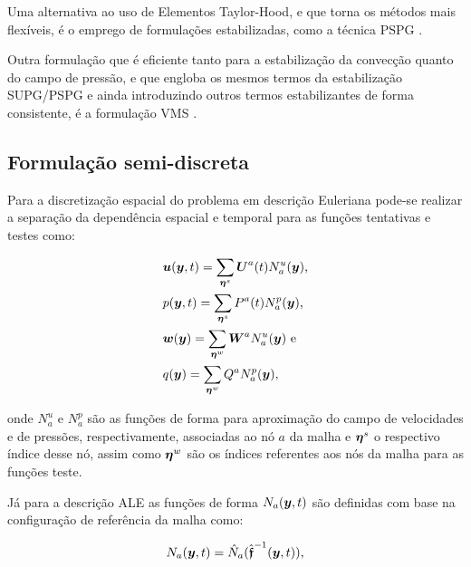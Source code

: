 Uma alternativa ao uso de Elementos Taylor-Hood, e que torna os métodos mais flexíveis, é o emprego de formulações estabilizadas, como a técnica PSPG \cite{tezduyar1991stabilized}.

Outra formulação que é eficiente tanto para a estabilização da convecção quanto do campo de pressão, e que engloba os mesmos termos da estabilização SUPG/PSPG e ainda introduzindo outros termos estabilizantes de forma consistente, é a formulação VMS \cite{bazilevs2013computational}.

\subsection{Formulação semi-discreta}

Para a discretização espacial do problema em descrição Euleriana pode-se realizar a separação da dependência espacial e temporal para as funções tentativas e testes como:

\begin{subequations}
    \begin{align}
         & \boldsymbol{u}(\boldsymbol{y},t)=\sum_{\boldsymbol{\eta}^s}{\boldsymbol{U}^a(t)N_a^u(\boldsymbol{y})}\text{,}\label{eq:uh} \\
         & p(\boldsymbol{y},t)=\sum_{\boldsymbol{\eta}^s}{P^a(t)N_a^p(\boldsymbol{y})}\text{,}                        \\
         & \boldsymbol{w}(\boldsymbol{y})=\sum_{\boldsymbol{\eta}^w}{\boldsymbol{W}^aN_a^u(\boldsymbol{y})}\text{ e}\label{eq:w-sep}  \\
         & q(\boldsymbol{y})=\sum_{\boldsymbol{\eta}^w}{Q^aN_a^p(\boldsymbol{y})}\text{,}\label{eq:q-sep}
    \end{align}
\end{subequations}

\noindent onde $N_a^u$ e $N_a^p$ são as funções de forma para aproximação do campo de velocidades e de pressões, respectivamente, associadas ao nó $a$ da malha e $\boldsymbol{\eta}^s$ o respectivo índice desse nó, assim como $\boldsymbol{\eta}^w$ são os índices referentes aos nós da malha para as funções teste.

Já para a descrição ALE as funções de forma $N_a(\boldsymbol{y},t)$ são definidas com base na configuração de referência da malha como:

\begin{equation}
    N_a(\boldsymbol{y},t)=\hat{N}_a(\hat{\boldsymbol{\mathfrak{f}}}^{-1}(\boldsymbol{y},t))\text{,}
\end{equation}

